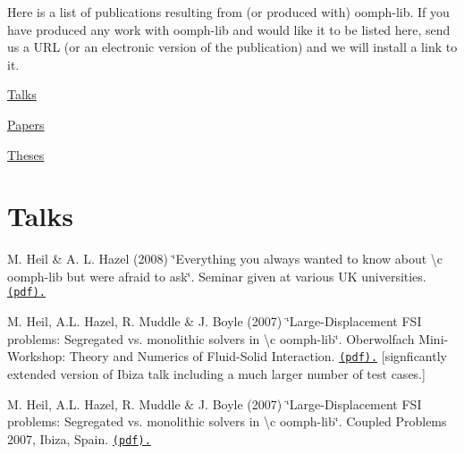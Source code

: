Here is a list of publications resulting from (or produced with) {\ttfamily oomph-\/lib}. If you have produced any work with {\ttfamily oomph-\/lib} and would like it to be listed here, send us a U\-R\-L (or an electronic version of the publication) and we will install a link to it.


\begin{DoxyItemize}
\item \hyperlink{index_talks}{Talks}
\item \hyperlink{index_papers}{Papers}
\item \hyperlink{index_theses}{Theses}
\end{DoxyItemize}

 

\hypertarget{index_talks}{}\section{Talks}\label{index_talks}

\begin{DoxyItemize}
\item M. Heil \& A. L. Hazel (2008) \char`\"{}\-Everything you always wanted to 
  know about \textbackslash{}c oomph-\/lib but were afraid to ask\char`\"{}. Seminar given at various U\-K universities. \href{http://www.maths.man.ac.uk/~mheil/oomph_lib_additional_material/oomph_talk_beamer/oomph-lib-beamer.pdf}{\tt (pdf).}
\end{DoxyItemize}


\begin{DoxyItemize}
\item M. Heil, A.\-L. Hazel, R. Muddle \& J. Boyle (2007) \char`\"{}\-Large-\/\-Displacement 
  F\-S\-I problems\-: Segregated vs. monolithic solvers in \textbackslash{}c oomph-\/lib\char`\"{}. Oberwolfach Mini-\/\-Workshop\-: Theory and Numerics of Fluid-\/\-Solid Interaction. \href{http://www.maths.man.ac.uk/~mheil/oomph_lib_additional_material/OberwolfachFSI2007/Oberwolfach.pdf}{\tt (pdf).} \mbox{[}signficantly extended version of Ibiza talk including a much larger number of test cases.\mbox{]}
\end{DoxyItemize}


\begin{DoxyItemize}
\item M. Heil, A.\-L. Hazel, R. Muddle \& J. Boyle (2007) \char`\"{}\-Large-\/\-Displacement 
  F\-S\-I problems\-: Segregated vs. monolithic solvers in \textbackslash{}c oomph-\/lib\char`\"{}. Coupled Problems 2007, Ibiza, Spain. \href{http://www.maths.man.ac.uk/~mheil/oomph_lib_additional_material/Ibiza2007/Ibiza.pdf}{\tt (pdf).}
\end{DoxyItemize}


